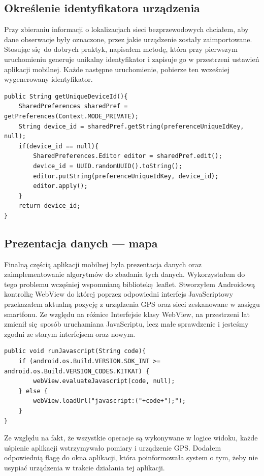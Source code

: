 \subsection{Określenie identyfikatora urządzenia}
Przy zbieraniu informacji o lokalizacjach sieci bezprzewodowych chciałem, aby dane obserwacje były oznaczone, przez jakie urządzenie zostały zaimportowane. Stosując się do dobrych praktyk, napisałem metodę, która przy pierwszym uruchomieniu generuje unikalny identyfikator i zapisuje go w przestrzeni ustawień aplikacji mobilnej. Każde następne uruchomienie, pobierze ten wcześniej wygenerowany identyfikator.
\begin{verbatim}
public String getUniqueDeviceId(){
    SharedPreferences sharedPref = getPreferences(Context.MODE_PRIVATE);
    String device_id = sharedPref.getString(preferenceUniqueIdKey, null);
    if(device_id == null){
        SharedPreferences.Editor editor = sharedPref.edit();
        device_id = UUID.randomUUID().toString();
        editor.putString(preferenceUniqueIdKey, device_id);
        editor.apply();
    }
    return device_id;
}
\end{verbatim}

\subsection{Prezentacja danych — mapa}
Finalną częścią aplikacji mobilnej była prezentacja danych oraz zaimplementowanie algorytmów do zbadania tych danych. Wykorzystałem do tego problemu wczęśniej wspomnianą bibliotekę leaflet. Stworzyłem Androidową kontrolkę WebView do której poprzez odpowiedni interfejs JavaScriptowy przekazałem aktualną pozycję z urządzenia GPS oraz sieci zeskanowane w zasięgu smartfonu. Ze względu na różnice Interfejsie klasy WebView, na przestrzeni lat zmienił się sposób uruchamiana JavaScriptu, lecz małe sprawdzenie i jesteśmy zgodni ze starym interfejsem oraz nowym.

\begin{verbatim}
public void runJavascript(String code){
    if (android.os.Build.VERSION.SDK_INT >= android.os.Build.VERSION_CODES.KITKAT) {
        webView.evaluateJavascript(code, null);
    } else {
        webView.loadUrl("javascript:("+code+");");
    }
}
\end{verbatim}

Ze względu na fakt, że wszystkie operacje są wykonywane w logice widoku, każde uśpienie aplikacji wstrzymywało pomiary i urządzenie GPS. Dodałem odpowiednią flagę do okna aplikacji, która poinformowała system o tym, żeby nie usypiać urządzenia w trakcie działania tej aplikacji.

